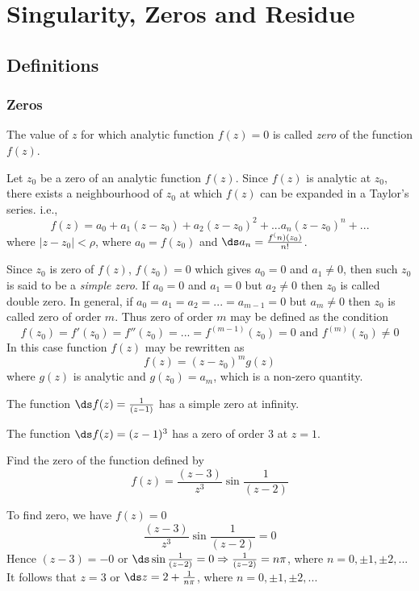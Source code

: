 \chapter{Singularity, Zeros and Residue}
\section{Definitions}
\subsection{Zeros}
\begin{df}
The value of $z$ for which analytic function $f(z) = 0$ is called \textit{zero} of the function $f(z)$. 
\end{df}
Let $z_0$ be a zero of an analytic function $f(z)$. Since $f(z)$ is analytic at $z_0$, there exists a neighbourhood of $z_0$ at which $f(z)$ can be expanded in a Taylor's series. i.e.,
\[
f(z) = a_0 + a_1(z-z_0) + a_2(z-z_0)^2 + ... a_n(z-z_0)^n + ...
\]
where $|z-z_0|< \rho$, where $a_0=f(z_0)$ and $\ds a_n = \frac{f^(n)(z_0)}{n!}$.

Since $z_0$ is zero of $f(z)$, $f(z_0)=0$ which gives $a_0=0$ and $a_1 \neq 0$, then such $z_0$ is said to be a \textit{simple zero}. If $a_0=0$ and $a_1=0$ but $a_2 \neq 0$ then $z_0$ is called double zero. In general, if $a_0=a_1=a_2= ... = a_{m-1}=0$ but $a_m \neq 0$ then $z_0$ is called zero of order $m$. Thus zero of order $m$ may be defined as the condition
\begin{equation}
	f(z_0)=f'(z_0)=f''(z_0)= ... = f^{(m-1)}(z_0) =0 \text{ and } f^{(m)}(z_0) \neq 0
\end{equation}
In this case function $f(z)$ may be rewritten as
\begin{equation}
	f(z) = (z-z_0)^m g(z)
\end{equation}
where $g(z)$ is analytic and $g(z_0)=a_m$, which is a non-zero quantity.
\begin{example}
The function $\ds f(z) = \frac{1}{(z-1)}$ has a simple zero at infinity.
\end{example}
\begin{example}
The function $\ds f(z) = (z-1)^3$ has a zero of order 3 at $z=1$.
\end{example}
\begin{example}
Find the zero of the function defined by
\[f(z) = \frac{(z-3)}{z^3} \sin \frac{1}{(z-2)}\]
\end{example}
\begin{solution}
To find zero, we have $f(z)=0$
\[\frac{(z-3)}{z^3} \sin \frac{1}{(z-2)} = 0\]
Hence $(z-3)=-0$ or $\ds \sin \frac{1}{(z-2)} = 0 \Rightarrow \frac{1}{(z-2)} = n\pi$, where $n=0, \pm 1, \pm 2, ...$
It follows that $z=3$ or $\ds z = 2 + \frac{1}{n\pi}$, where $n=0, \pm 1, \pm 2, ...$
\end{solution}

